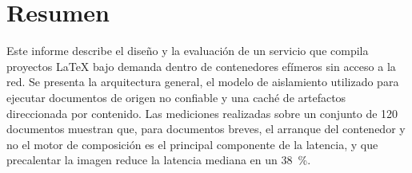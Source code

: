 \documentclass[12pt,a4paper]{report}
\begin{document}
\chapter*{Resumen}
Este informe describe el diseño y la evaluación de un servicio que compila
proyectos \LaTeX{} bajo demanda dentro de contenedores efímeros sin acceso a
la red. Se presenta la arquitectura general, el modelo de aislamiento
utilizado para ejecutar documentos de origen no confiable y una caché de
artefactos direccionada por contenido. Las mediciones realizadas sobre un
conjunto de 120 documentos muestran que, para documentos breves, el arranque
del contenedor y no el motor de composición es el principal componente de la
latencia, y que precalentar la imagen reduce la latencia mediana en un 38~\%.

\tableofcontents
\listoffigures
\listoftables

\cleardoublepage
{}





\cleardoublepage
{}


\end{document}
